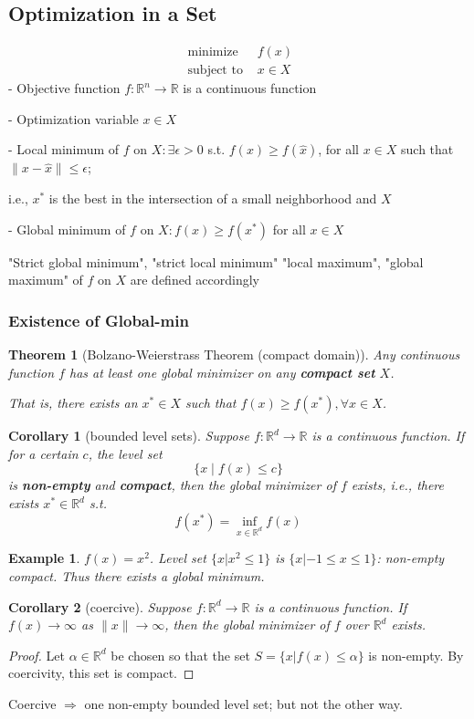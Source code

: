 \documentclass[11pt,a4paper]{article}
\newtheorem{theorem}{Theorem}
\newtheorem{example}{Example}
\newtheorem{corollary}{Corollary}
\begin{document}
\subsection{Optimization in a Set}
$$\begin{array}{ll}\text { minimize } & f(x) \\ \text { subject to } & x \in X\end{array}$$
- Objective function $f: \mathbb{R}^{n} \rightarrow \mathbb{R}$ is a continuous function

- Optimization variable $x \in X$

- Local minimum of $f$ on $X: \exists \epsilon>0$ s.t. $f(x) \geq f(\hat{x})$, for all $x \in X$ such that $\|x-\hat{x}\| \leq \epsilon$;

i.e., $x^{*}$ is the best in the intersection of a small neighborhood and $X$

- Global minimum of $f$ on $X: f(x) \geq f\left(x^{*}\right)$ for all $x \in X$

"Strict global minimum", "strict local minimum" "local maximum", "global maximum" of $f$ on $X$ are defined accordingly

\subsubsection{Existence of Global-min}
\begin{theorem}[Bolzano-Weierstrass Theorem (compact domain)]
    Any continuous function $f$ has at least one global minimizer on any \textbf{compact set} $X$.

    That is, there exists an $x^{*} \in X$ such that $f(x) \geq f\left(x^{*}\right), \forall x \in X$.
\end{theorem}

\begin{corollary}[bounded level sets]
    Suppose $f: \mathbb{R}^{d} \rightarrow \mathbb{R}$ is a continuous function. If for a certain $c$, the level set
    $$
    \{x \mid f(x) \leq c\}
    $$
    is \textbf{non-empty} and \textbf{compact}, then the global minimizer of $f$ exists, i.e., there exists $x^{*} \in \mathbb{R}^{d}$ s.t.
    $$
    f\left(x^{*}\right)=\inf _{x \in \mathbb{R}^{d}} f(x)
    $$
\end{corollary}
\begin{example}
    $f(x) = x^2$.
    Level set $\{x|x^2 \leq 1\}$ is $\{x|−1\leq x\leq 1\}$: non-empty compact. Thus there exists a global minimum.
\end{example}
\begin{corollary}[coercive]
    Suppose $f: \mathbb{R}^{d} \rightarrow \mathbb{R}$ is a continuous function. If $f(x) \rightarrow \infty$ as $\|x\| \rightarrow \infty$, then the global minimizer of $f$ over $\mathbb{R}^{d}$ exists.
\end{corollary}
\begin{proof}
Let $\alpha\in \mathbb{R}^d$ be chosen so that the set $S = \{x |f(x) \leq \alpha\}$ is non-empty. By coercivity,
this set is compact.
\end{proof}
Coercive $\Rightarrow$ one non-empty bounded level set; but not the other way.
\end{document}
